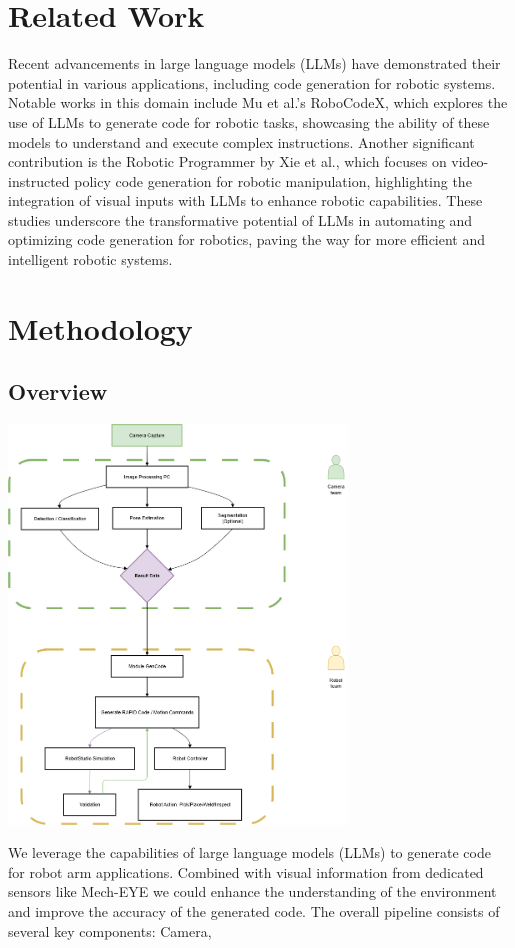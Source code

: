 \documentclass[conference]{IEEEtran}
\begin{document}
\section{Related Work}
Recent advancements in large language models (LLMs) have demonstrated their potential in various applications, including code generation for robotic systems. Notable works in this domain include Mu et al.'s RoboCodeX\cite{mu2024robocodex}, which explores the use of LLMs to generate code for robotic tasks, showcasing the ability of these models to understand and execute complex instructions. Another significant contribution is the Robotic Programmer by Xie et al.\cite{xie2025robotic}, which focuses on video-instructed policy code generation for robotic manipulation, highlighting the integration of visual inputs with LLMs to enhance robotic capabilities. These studies underscore the transformative potential of LLMs in automating and optimizing code generation for robotics, paving the way for more efficient and intelligent robotic systems.

\section{Methodology}
\subsection{Overview}
\includegraphics[width= 9cm]{flow.png}

We leverage the capabilities of large language models (LLMs) to generate code for robot arm applications. Combined with visual information from dedicated sensors like Mech-EYE we could enhance the understanding of the environment and improve the accuracy of the generated code. 
The overall pipeline consists of several key components: Camera, 
\end{document}
